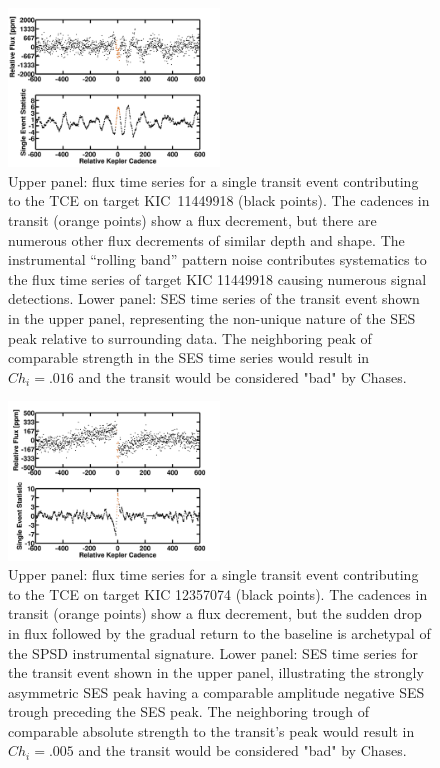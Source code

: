 \begin{figure}[htb]
\includegraphics[width=0.5\textwidth]{kic11449918_rb.png}
\caption{Upper panel: flux time series for a single transit event contributing to the TCE on target KIC~11449918 (black points).  The cadences in transit (orange points) show a flux decrement, but there are numerous other flux decrements of similar depth and shape.  The instrumental ``rolling band'' pattern noise contributes systematics to the flux time series of target KIC 11449918 causing numerous signal detections.  Lower panel: SES time series of the transit event shown in the upper panel, representing the non-unique nature of the SES peak relative to surrounding data. The neighboring peak of comparable strength in the SES time series would result in $Ch_{i}=.016$ and the transit would be considered "bad" by Chases. }
\label{fig:chases2}
\end{figure}

\begin{figure}[htb]
\includegraphics[width=0.5\textwidth]{kic12357074_spsd.png}
\caption{Upper panel: flux time series for a single transit event contributing to the TCE on target KIC 12357074 (black points).  The cadences in transit (orange points) show a flux decrement, but the sudden drop in flux followed by the gradual return to the baseline is archetypal of the SPSD instrumental signature.  Lower panel: SES time series for the transit event shown in the upper panel, illustrating the strongly asymmetric SES peak having a comparable amplitude negative SES trough preceding the SES peak. The neighboring trough of comparable absolute strength to the transit's peak would result in $Ch_{i}=.005$ and the transit would be considered "bad" by Chases.}
\label{fig:chases3}
\end{figure}


